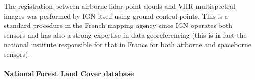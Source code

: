 The registration between airborne lidar point clouds and VHR multispectral images was performed by IGN itself using ground control points. This is a standard procedure in the French mapping agency since IGN operates both sensors and has also a strong expertise in data georeferencing (this is in fact the national institute responsible for that in France for both airborne and spaceborne sensors). \\

\paragraph{National Forest Land Cover database \\}
%
%
%
%
%
%
%
%
%
%
%
%
%


